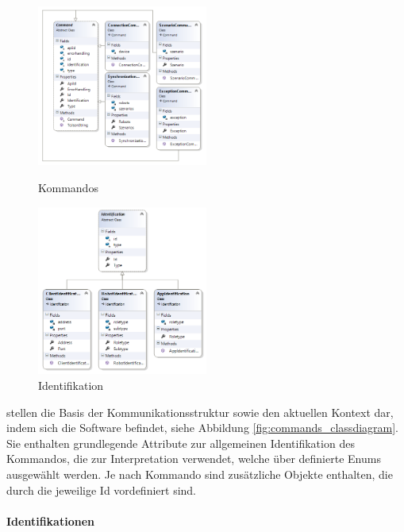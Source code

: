 \begin{figure}
	\begin{center}
		\includegraphics[width=0.5\textwidth]{images/uml/commands.png}
	\end{center}
	\caption{Kommandos}
	\label{fig:commands_classdiagram}
	\begin{center}
		\includegraphics[width=0.5\textwidth]{images/uml/identification.png}
	\end{center}
	\caption{Identifikation}
	\label{fig:identification_classdiagram}
\end{figure}

stellen die Basis der Kommunikationsstruktur sowie den aktuellen Kontext dar, indem sich die Software befindet, siehe Abbildung \ref{fig:commands_classdiagram}. Sie enthalten grundlegende Attribute zur allgemeinen Identifikation des Kommandos, die zur Interpretation verwendet, welche über definierte Enums ausgewählt werden. Je nach Kommando sind zusätzliche Objekte enthalten, die durch die jeweilige Id vordefiniert sind.\\

\paragraph{Identifikationen}

